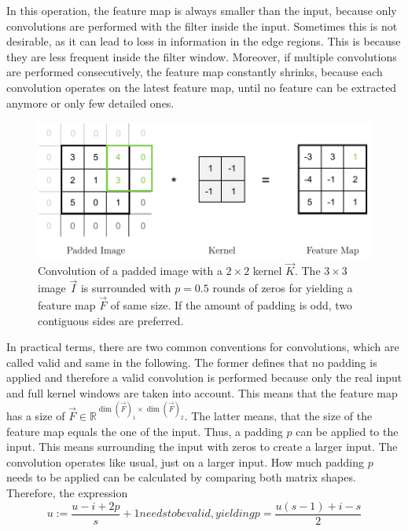 In this operation, the feature map is always smaller than the input, because only convolutions are performed with the filter inside the input.
Sometimes this is not desirable, as it can lead to loss in information in the edge regions.
This is because they are less frequent inside the filter window.
Moreover, if multiple convolutions are performed consecutively, the feature map constantly shrinks, because each convolution operates on the latest feature map, until no feature can be extracted anymore or only few detailed ones.
\begin{figure}
	\centering
	\includegraphics{images/convolution_padding.pdf}
	\caption[Convolution of a padded image with a kernel]{Convolution of a padded image with a $2 \times 2$ kernel $\vec{K}$. The $3 \times 3$ image $\vec{I}$ is surrounded with $p=0.5$ rounds of zeros for yielding a feature map $\vec{F}$ of same size. If the amount of padding is odd, two contiguous sides are preferred.}
	\label{fig:convolution-padding}
\end{figure}
In practical terms, there are two common conventions for convolutions, which are called valid and same in the following.
The former defines that no padding is applied and therefore a valid convolution is performed because only the real input and full kernel windows are taken into account.
This means that the feature map has a size of $\vec{F} \in \mathbb{R}^{\dim(\vec{F})_1 \times \dim(\vec{F})_2}$.
The latter means, that the size of the feature map equals the one of the input.
Thus, a padding $p$ can be applied to the input.
This means surrounding the input with zeros to create a larger input.
The convolution operates like usual, just on a larger input.
How much padding $p$ needs to be applied can be calculated by comparing both matrix shapes.
Therefore, the expression
\begin{subequations}
	\begin{equation}
		u := \frac{u-i+2p}{s}+1
	\end{equation}
needs to be valid, yielding
\begin{equation}
	p = \frac{u(s-1)+i-s}{2}
\end{equation}
\end{subequations}
